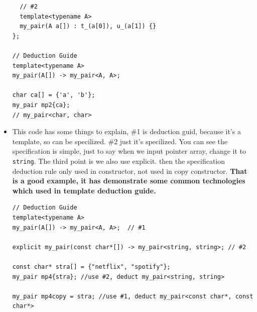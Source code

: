\documentclass[a4paper,11pt,twoside]{book}
\begin{document}
\begin{itemize}
\begin{lstlisting}
  // #2
  template<typename A>
  my_pair(A a[]) : t_(a[0]), u_(a[1]) {}
};

// Deduction Guide
template<typename A>
my_pair(A[]) -> my_pair<A, A>;

char ca[] = {'a', 'b'};
my_pair mp2{ca};
// my_pair<char, char>
\end{lstlisting}

    \item This code has some things to explain, \#1 is deduction guid, because it's a template, so can be specilized. \#2 just it's specilized. You can see the specification is simple, just to say when we input pointer array, change it to \texttt{string}. The third point is we also use explicit. then the specification deduction rule only used in constructor, not used in copy constructor. \textbf{That is a good example, it has demonstrate some common technologies which used in template deduction guide.}

\begin{lstlisting}
// Deduction Guide
template<typename A>
my_pair(A[]) -> my_pair<A, A>;  // #1

explicit my_pair(const char*[]) -> my_pair<string, string>; // #2

const char* stra[] = {"netflix", "spotify"};
my_pair mp4{stra}; //use #2, deduct my_pair<string, string>

my_pair mp4copy = stra; //use #1, deduct my_pair<const char*, const char*>
\end{lstlisting}

\end{itemize}
\end{document}
